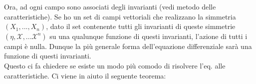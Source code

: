 \documentclass{report}
\begin{document}
Ora, ad ogni campo sono associati degli invarianti (vedi metodo delle caratteristiche). Se ho un set di campi vettoriali che realizzano la simmetria $(X_1, ..., X_n)$, dato il set contenente tutti gli invarianti di queste simmetrie $(\eta, \mathcal{X}, ...\mathcal{X}^n)$ su una qualunque funzione di questi invarianti, l'azione di tutti i campi è nulla. Dunque la più generale forma dell'equazione differenziale sarà una funzione di questi invarianti. \\

Questo ci fa chiedere se esiste un modo più comodo di risolvere l'eq. alle caratteristiche. Ci viene in aiuto il seguente teorema: 

\end{document}
